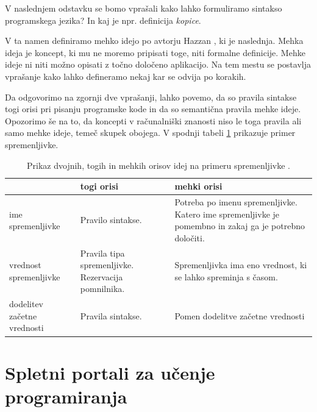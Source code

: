 V naslednjem odstavku se bomo vprašali kako lahko formuliramo sintakso
programskega jezika? In kaj je npr. definicija \emph{kopice}.

V ta namen definiramo mehko idejo po avtorju Hazzan \cite{guideTCS},
ki je naslednja. Mehka ideja je koncept, ki mu ne moremo pripisati
toge, niti formalne definicije. Mehke ideje ni niti možno opisati z
točno določeno aplikacijo. Na tem mestu se postavlja vprašanje kako
lahko defineramo nekaj kar se odvija po korakih.

Da odgovorimo na zgornji dve vprašanji, lahko povemo, da so pravila
sintakse togi orisi pri pisanju programske kode in da so semantična
pravila mehke ideje. Opozorimo še na to, da koncepti v računalniški
znanosti niso le toga pravila ali samo mehke ideje, temeč skupek
obojega. V spodnji tabeli \ref{tab:koncept_spremenljivka} prikazuje
primer spremenljivke.


\begin{table}[!htb]

\caption{Prikaz dvojnih, togih in mehkih orisov idej na primeru
  spremenljivke \cite{guideTCS}. }
\label{tab:koncept_spremenljivka}
\begin{tabular}{
  | p{} |
  p{} |
  p{} | }
  \hline
  \rowcolor{gray!50}
  & \textbf{togi orisi} & \textbf{mehki orisi}\\
  \hline
  ime spremenljivke & Pravilo sintakse. & Potreba po imenu
                                          spremenljivke. Katero ime
                                          spremenljivke je pomembno in
                                          zakaj ga je potrebno
                                          določiti.\\
  \hline
  vrednost spremenljivke & Pravila tipa spremenljivke. Rezervacija
                           pomnilnika. & Spremenljivka ima eno
                                         vrednost, ki se lahko
                                         spreminja s časom.\\
  \hline
  dodelitev začetne vrednosti & Pravila sintakse. & Pomen dodelitve
                                                  začetne vrednosti\\
  \hline

\end{tabular}
\end{table}


\section{Spletni portali za učenje programiranja}
\label{sec:SPUP}

